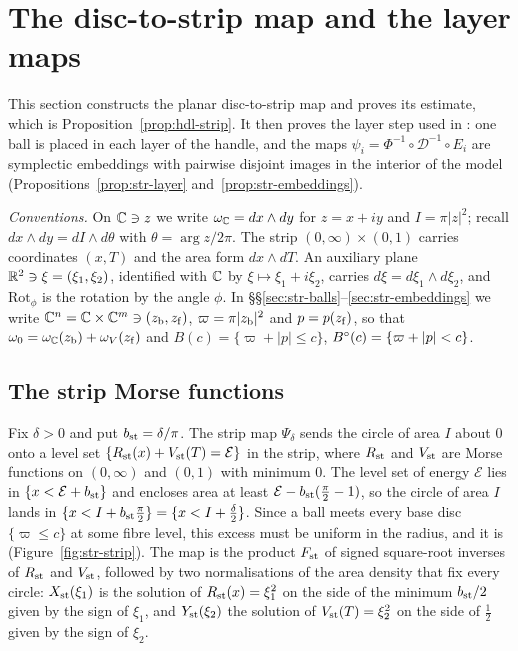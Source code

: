 \section{The disc-to-strip map and the layer maps}\label{sec:str}

This section constructs the planar disc-to-strip map and proves its estimate, which is
Proposition~\ref{prop:hdl-strip}. It then proves the layer step used in : one ball is placed in
each layer of the handle, and the maps $\psi_i=\Phi^{-1}\circ\mathcal D^{-1}\circ E_i$ are symplectic embeddings with
pairwise disjoint images in the interior of the model (Propositions~\ref{prop:str-layer}
and~\ref{prop:str-embeddings}).

\medskip\noindent\emph{Conventions.} On $\mathbb{C}\ni z$ we write $\omega_{\mathbb{C}}=dx\wedge dy$ for $z=x+iy$ and $I=\pi|z|^2$;
recall $dx\wedge dy=dI\wedge d\theta$ with $\theta=\arg z/2\pi$. The strip $(0,\infty)\times(0,1)$ carries coordinates
$(x,T)$ and the area form $dx\wedge dT$. An auxiliary plane $\mathbb{R}^2\ni\xi=(\xi_1,\xi_2)$, identified with $\mathbb{C}$ by
$\xi\mapsto\xi_1+i\xi_2$, carries $d\xi=d\xi_1\wedge d\xi_2$, and $\mathrm{Rot}_\phi$ is the rotation by the angle
$\phi$. In \S\S\ref{sec:str-balls}--\ref{sec:str-embeddings} we write $\mathbb{C}^n=\mathbb{C}\times\mathbb{C}^m\ni(z_{\rm b},z_{\rm f})$,
$\varpi=\pi|z_{\rm b}|^2$ and $p=p(z_{\rm f})$, so that $\omega_0=\omega_{\mathbb{C}}(z_{\rm b})+\omega_V(z_{\rm f})$ and
$B(c)=\{\varpi+|p|\le c\}$, $B^{\circ}(c)=\{\varpi+|p|<c\}$.

\subsection{The strip Morse functions}\label{sec:str-morse}

Fix $\delta>0$ and put $b_{\rm st}=\delta/\pi$. The strip map $\Psi_\delta$ sends the circle of area $I$ about $0$ onto a
level set $\{R_{\rm st}(x)+V_{\rm st}(T)=\mathcal E\}$ in the strip, where $R_{\rm st}$ and $V_{\rm st}$ are Morse functions
on $(0,\infty)$ and $(0,1)$ with minimum $0$. The level set of energy $\mathcal E$ lies in $\{x<\mathcal E+b_{\rm st}\}$ and
encloses area at least $\mathcal E-b_{\rm st}(\frac\pi2-1)$, so the circle of area $I$ lands in
$\{x<I+b_{\rm st}\frac\pi2\}=\{x<I+\frac\delta2\}$. Since a ball meets every base disc $\{\varpi\le c\}$ at some fibre
level, this excess must be uniform in the radius, and it is (Figure~\ref{fig:str-strip}). The map is the product $F_{\rm st}$ of signed square-root
inverses of $R_{\rm st}$ and $V_{\rm st}$, followed by two normalisations of the area density that fix every circle:
$X_{\rm st}(\xi_1)$ is the solution of $R_{\rm st}(x)=\xi_1^2$ on the side of the minimum $b_{\rm st}/2$ given by the sign
of $\xi_1$, and $Y_{\rm st}(\xi_2)$ the solution of $V_{\rm st}(T)=\xi_2^2$ on the side of $\frac12$ given by the sign of
$\xi_2$.

